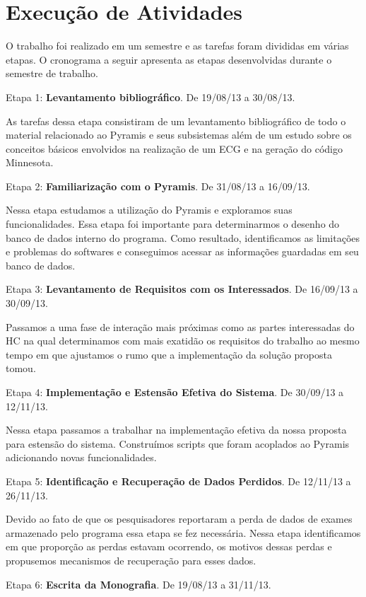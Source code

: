 \section{Execução de Atividades}

O trabalho foi realizado em um semestre e as tarefas foram divididas em várias etapas. O cronograma a seguir apresenta as etapas desenvolvidas durante o semestre de trabalho.

Etapa 1: \textbf{Levantamento bibliográfico}. De 19/08/13 a 30/08/13.

As tarefas dessa etapa consistiram de um levantamento bibliográfico de todo o material relacionado ao Pyramis e seus subsistemas além de um estudo sobre os conceitos básicos envolvidos na realização de um ECG e na geração do código Minnesota.

Etapa 2: \textbf{Familiarização com o Pyramis}. De 31/08/13 a 16/09/13.

Nessa etapa estudamos a utilização do Pyramis e exploramos suas funcionalidades. Essa etapa foi importante para determinarmos o desenho do banco de dados interno do programa. Como resultado, identificamos as limitações e problemas do softwares e conseguimos acessar as informações guardadas em seu banco de dados.

Etapa 3: \textbf{Levantamento de Requisitos com os Interessados}. De 16/09/13 a 30/09/13.

Passamos a uma fase de interação mais próximas como as partes interessadas do HC na qual determinamos com mais exatidão os requisitos do trabalho ao mesmo tempo em que ajustamos o rumo que a implementação da solução proposta tomou.

Etapa 4: \textbf{Implementação e Estensão Efetiva do Sistema}. De 30/09/13 a 12/11/13.

Nessa etapa passamos a trabalhar na implementação efetiva da nossa proposta para estensão do sistema. Construímos scripts que foram acoplados ao Pyramis adicionando novas funcionalidades.

Etapa 5: \textbf{Identificação e Recuperação de Dados Perdidos}. De 12/11/13 a 26/11/13.

Devido ao fato de que os pesquisadores reportaram a perda de dados de exames armazenado pelo programa essa etapa se fez necessária. Nessa etapa identificamos em que proporção as perdas estavam ocorrendo, os motivos dessas perdas e propusemos mecanismos de recuperação para esses dados.

Etapa 6: \textbf{Escrita da Monografia}. De 19/08/13 a 31/11/13.

